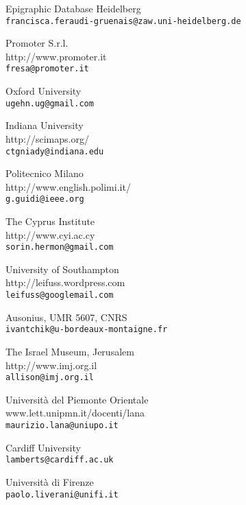 \begin{contributors}
{ Epigraphic Database Heidelberg	  \\
\texttt{francisca.feraudi-gruenais@zaw.uni-heidelberg.de	}
}
		

{  	Promoter S.r.l. \\
{http://www.promoter.it} \\
\texttt{fresa@promoter.it}
}


{ Oxford University	  \\
\texttt{ugehn.ug@gmail.com}
}
	

{ Indiana University  \\
{	http://scimaps.org/}	\\
\texttt{ctgniady@indiana.edu}
}
	


{  Politecnico Milano \\
{http://www.english.polimi.it/ }\\
\texttt{g.guidi@ieee.org}
}

{  The Cyprus Institute	 \\
{http://www.cyi.ac.cy} \\
\texttt{sorin.hermon@gmail.com}
}

	

{  University of Southampton	 \\
{http://leifuss.wordpress.com} \\
\texttt{leifuss@googlemail.com	}
}

{  Ausonius, UMR 5607, CNRS	 \\
\texttt{ivantchik@u-bordeaux-montaigne.fr}
}

	
	
{ The Israel Museum, Jerusalem	  \\
{http://www.imj.org.il} \\
\texttt{allison@imj.org.il}
}
			
			
{  Università del Piemonte Orientale	 \\
{www.lett.unipmn.it/docenti/lana}	 \\
\texttt{maurizio.lana@uniupo.it}
}
			
{   Cardiff University\\
\texttt{lamberts@cardiff.ac.uk}
}


{  Università di Firenze \\
\texttt{paolo.liverani@unifi.it}
}


\end{contributors}
